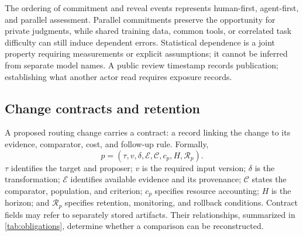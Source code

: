 The ordering of commitment and reveal events represents human-first, agent-first, and parallel assessment. Parallel commitments preserve the opportunity for private judgments, while shared training data, common tools, or correlated task difficulty can still induce dependent errors. Statistical dependence is a joint property requiring measurements or explicit assumptions; it cannot be inferred from separate model names. A public review timestamp records publication; establishing what another actor read requires exposure records.

\subsection{Change contracts and retention}
A proposed routing change carries a contract: a record linking the change to its evidence, comparator, cost, and follow-up rule. Formally,
\begin{equation}
p=(\tau,v,\delta,\mathcal E,\mathcal C,c_p,H,\mathcal R_p).
\label{eq:patch}
\end{equation}
$\tau$ identifies the target and proposer; $v$ is the required input version; $\delta$ is the transformation; $\mathcal E$ identifies available evidence and its provenance; $\mathcal C$ states the comparator, population, and criterion; $c_p$ specifies resource accounting; $H$ is the horizon; and $\mathcal R_p$ specifies retention, monitoring, and rollback conditions. Contract fields may refer to separately stored artifacts. Their relationships, summarized in \cref{tab:obligations}, determine whether a comparison can be reconstructed.

